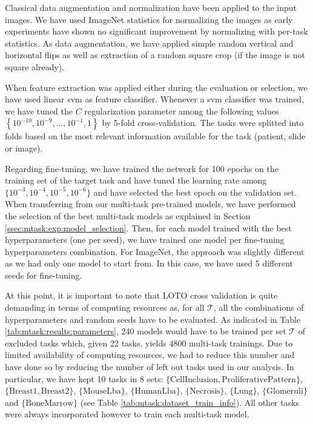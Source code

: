 Classical data augmentation and normalization have been applied to the input images. We have used ImageNet statistics for normalizing the images as early experiments have shown no significant improvement by normalizing with per-task statistics. As data augmentation, we have applied simple random vertical and horizontal flips as well as extraction of a random square crop (if the image is not square already).

When feature extraction was applied either during the evaluation or selection, we have used linear \acrshort{svm} \cite{fan2008liblinear} as feature classifier. Whenever a \acrshort{svm} classifier was trained, we have tuned the $C$ regularization parameter among the following values $\left\{10^{-10}, 10^{-9},...,10^{-1},1\right\}$ by 5-fold cross-validation. The tasks were splitted into folds based on the most relevant information available for the task (patient, slide or image).

Regarding fine-tuning, we have trained the network for 100 epochs on the training set of the target task and have tuned the learning rate among $\{10^{-3}, 10^{-4}, 10^{-5}, 10^{-6}\}$ and have selected the best epoch on the validation set. When transferring from our multi-task pre-trained models, we have performed the selection of the best multi-task models as explained in Section \ref{ssec:mtask:exp:model_selection}. Then, for each model trained with the best hyperparameters (\ie one per seed), we have trained one model per fine-tuning hyperparameters combination. For ImageNet, the approach was slightly different as we had only one model to start from. In this case, we have used 5 different seeds for fine-tuning. 

At this point, it is important to note that LOTO cross validation is quite demanding in terms of computing resources as, for all $\mathcal{T}$, all the combinations of hyperparameters and random seeds have to be evaluated. As indicated in Table \ref{tab:mtask:results:parameters}, 240 models would have to be trained per set $\mathcal{T}$ of excluded tasks which, given 22 tasks, yields 4800 multi-task trainings. Due to limited availability of computing resources, we had to reduce this number and have done so by reducing the number of left out tasks used in our analysis. In particular, we have kept 10 tasks in 8 sets: $\{\text{CellInclusion}, \text{ProliferativePattern}\}$, $\{\text{Breast1}, \text{Breast2}\}$, $\{\text{MouseLba}\}$, $\{\text{HumanLba}\}$, $\{\text{Necrosis}\}$, $\{\text{Lung}\}$, $\{\text{Glomeruli}\}$ and $\{\text{BoneMarrow}\}$ (see Table \ref{tab:mtask:dataset_train_info}). All other tasks were always incorporated however to train each multi-task model.

